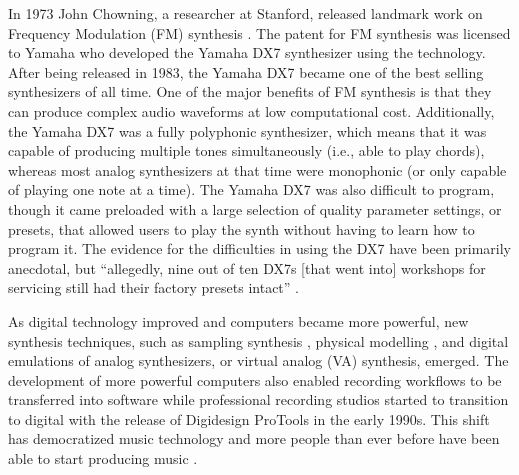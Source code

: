 In 1973 John Chowning, a researcher at Stanford, released landmark work on Frequency Modulation (FM) synthesis \cite{chowning1973synthesis}. The patent for FM synthesis was licensed to Yamaha who developed the Yamaha DX7 synthesizer using the technology. After being released in 1983, the Yamaha DX7 became one of the best selling synthesizers of all time. One of the major benefits of FM synthesis is that they can produce complex audio waveforms at low computational cost. Additionally, the Yamaha DX7 was a fully polyphonic synthesizer, which means that it was capable of producing multiple tones simultaneously (i.e., able to play chords), whereas most analog synthesizers at that time were monophonic (or only capable of playing one note at a time). The Yamaha DX7 was also difficult to program, though it came preloaded with a large selection of quality parameter settings, or presets, that allowed users to play the synth without having to learn how to program it. The evidence for the difficulties in using the DX7 have been primarily anecdotal, but “allegedly, nine out of ten DX7s [that went into] workshops for servicing still had their factory presets intact” \cite{seago2004critical}.

As digital technology improved and computers became more powerful, new synthesis techniques, such as sampling synthesis \cite{mcguire2015musical}, physical modelling \cite{jaffe1983extensions}, and digital emulations of analog synthesizers, or virtual analog (VA) synthesis, emerged. The development of more powerful computers also enabled recording workflows to be transferred into software while professional recording studios started to transition to digital with the release of Digidesign ProTools in the early 1990s. This shift has democratized music technology and more people than ever before have been able to start producing music \cite{tavana2015democracy}.


